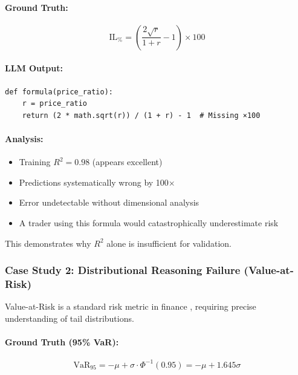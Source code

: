 \documentclass[twoside,11pt]{article}
\begin{document}
\paragraph{Ground Truth:}
\begin{equation}
\text{IL}_{\%} = \left(\frac{2\sqrt{r}}{1+r} - 1\right) \times 100
\end{equation}

\paragraph{LLM Output:}
\begin{verbatim}
def formula(price_ratio):
    r = price_ratio
    return (2 * math.sqrt(r)) / (1 + r) - 1  # Missing ×100
\end{verbatim}

\paragraph{Analysis:}
\begin{itemize}
\item Training $R^2 = 0.98$ (appears excellent)
\item Predictions systematically wrong by 100$\times$
\item Error undetectable without dimensional analysis
\item A trader using this formula would catastrophically underestimate risk
\end{itemize}

This demonstrates why $R^2$ alone is insufficient for validation.

\subsubsection{Case Study 2: Distributional Reasoning Failure (Value-at-Risk)}\citep{lewkowycz2022minerva}

Value-at-Risk is a standard risk metric in finance \citep{rockafellar2000optimization,danielsson2017forecasting}, requiring precise understanding of tail distributions.

\paragraph{Ground Truth (95\% VaR):}
\begin{equation}
\text{VaR}_{95} = -\mu + \sigma \cdot \Phi^{-1}(0.95) = -\mu + 1.645\sigma
\end{equation}
\end{document}
